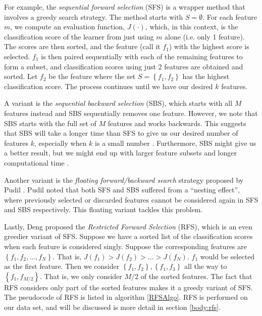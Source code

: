 \documentclass[12pt, twoside, a4paper]{report}
\begin{document}
For example, the \textit{sequential forward selection} (SFS) \cite{RefWorks:177} is a wrapper method that involves a greedy search strategy. The method starts with $S=\emptyset$. For each feature $m$, we compute an evaluation function, $J(\cdot)$, which, in this context, is the classification score of the learner from just using $m$ alone (i.e. only 1 feature). The scores are then sorted, and the feature (call it $f_1$) with the highest score is selected. $f_1$ is then paired sequentially with each of the remaining features to form a subset, and classification scores using just 2 features are obtained and sorted. Let $f_2$ be the feature where the set $S= \left\lbrace f_1, f_2 \right\rbrace$ has the highest classification score. The process continues until we have our desired $k$ features.
  
A variant is the \textit{sequential backward selection} (SBS), which starts with all $M$ features instead and SBS sequentially removes one feature. However, we note that SBS starts with the full set of $M$ features and works backwards. This suggests that SBS will take a longer time than SFS to give us our desired number of features $k$, especially when $k$ is a small number \cite{RefWorks:190}. Furthermore, SBS might give us a better result, but we might end up with larger feature subsets and longer computational time \cite{RefWorks:208}.

Another variant is the \textit{floating forward/backward search} strategy proposed by Pudil \cite{RefWorks:178}. Pudil noted that both SFS and SBS suffered from a ``nesting effect'', where previously selected or discarded features cannot be considered again in SFS and SBS respectively. This floating variant tackles this problem.

Lastly, Deng \cite{deng1998omega} proposed the \textit{Restricted Forward Selection} (RFS), which is an even greedier variant of SFS. Suppose we have a sorted list of the classification scores when each feature is considered singly. Suppose the corresponding features are $\left\lbrace f_1, f_2, \dots , f_N \right\rbrace$. That is, $J(f_1) > J(f_2) > \dots > J(f_N)$. $f_1$ would be selected as the first feature. Then we consider $\left\lbrace f_1, f_2 \right\rbrace, \left\lbrace f_1, f_3 \right\rbrace$ all the way to $\left\lbrace f_1, f_{M/2} \right\rbrace$. That is, we only consider $M/2$ of the sorted features. The fact that RFS considers only part of the sorted features makes it a greedy variant of SFS. The pseudocode of RFS is listed in algorithm \ref{RFSAlgo}. RFS is performed on our data set, and will be discussed is more detail in section \ref{body:rfs}.
\end{document}
